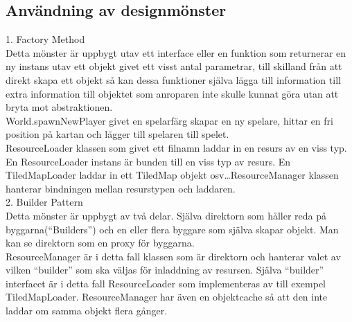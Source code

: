 \subsection{Användning av designmönster}
1. Factory Method\\
Detta mönster är uppbygt utav ett interface eller en funktion som returnerar en ny instans utav ett objekt givet ett visst antal parametrar, till skilland från att direkt skapa ett objekt så kan dessa funktioner själva lägga till information till extra information till objektet som anroparen inte skulle kunnat göra utan att bryta mot abstraktionen.\\
World.spawnNewPlayer givet en spelarfärg skapar en ny spelare, hittar en fri position på kartan och lägger till spelaren till spelet.\\
ResourceLoader klassen som givet ett filnamn laddar in en resurs av en viss typ. En ResourceLoader instans är bunden till en viss typ av resurs. En TiledMapLoader laddar in ett TiledMap objekt osv\ldots ResourceManager klassen hanterar bindningen mellan resurstypen och laddaren.\\
\vspace{11pt}
2. Builder Pattern\\
Detta mönster är uppbygt av två delar. Själva direktorn som håller reda på byggarna(``Builders'') och en eller flera byggare som själva skapar objekt. Man kan se direktorn som en proxy för byggarna.\\
ResourceManager är i detta fall klassen som är direktorn och hanterar valet av vilken ``builder'' som ska väljas för inladdning av resursen. Själva ``builder'' interfacet är i detta fall ResourceLoader som implementeras av till exempel TiledMapLoader. ResourceManager har även en objektcache så att den inte laddar om samma objekt flera gånger.\\
